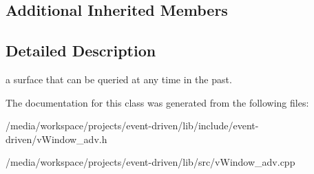 \subsection*{Additional Inherited Members}


\subsection{Detailed Description}
a surface that can be queried at any time in the past. 

The documentation for this class was generated from the following files\+:\begin{DoxyCompactItemize}
\item 
/media/workspace/projects/event-\/driven/lib/include/event-\/driven/v\+Window\+\_\+adv.\+h\item 
/media/workspace/projects/event-\/driven/lib/src/v\+Window\+\_\+adv.\+cpp\end{DoxyCompactItemize}

